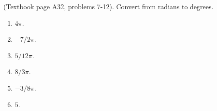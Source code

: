 (Textbook page A32, problems 7-12). 
Convert from radians to degrees.
\begin{multicols}{3}
\begin{enumerate}
\item $4\pi$.
\item $-7/2\pi$.
\item $5/12\pi$.
\item $8/3\pi$.
\item $-3/8\pi$.
\item $5$.
\end{enumerate}
\end{multicols}